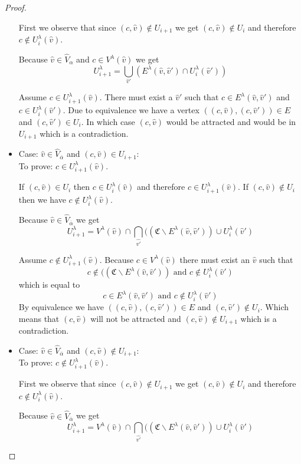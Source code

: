 \begin{lemma}
\begin{proof}
\begin{itemize}
			
			First we observe that since $(c, \hat{v}) \notin U_{i+1}$ we get $(c, \hat{v}) \notin U_{i}$ and therefore $c \notin U^\lambda_i(\hat{v})$.
			
			Because $\hat{v} \in \hat{V}_{\alpha}$ and $c \in V^\lambda(\hat{v})$ we get
			\[ U^\lambda_{i+1} =\bigcup_{\hat{v}'} (E^\lambda(\hat{v},\hat{v}') \cap U^\lambda_i(\hat{v}')) \]
			
			Assume $c \in U^\lambda_{i+1}(\hat{v})$. There must exist a $\hat{v}'$ such that $c \in E^\lambda(\hat{v},\hat{v}')$ and $c \in U^\lambda_i(\hat{v}')$. Due to equivalence we have a vertex $((c,\hat{v}),(c,\hat{v}')) \in E$ and $(c,\hat{v}') \in U_i$. In which case $(c,\hat{v})$ would be attracted and would be in $U_{i+1}$ which is a contradiction.
			\item Case: $\hat{v} \in \hat{V}_{\overline{\alpha}}$ and $(c,\hat{v}) \in U_{i+1}$:\\
			To prove: $c \in U^\lambda_{i+1}(\hat{v})$.
			
			If $(c,\hat{v}) \in U_i$ then $c \in U^\lambda_i(\hat{v})$ and therefore $c \in U^\lambda_{i+1}(\hat{v})$. If $(c,\hat{v}) \notin U_i$ then we have $c \notin U^\lambda_i(\hat{v})$.
			
			Because $\hat{v} \in \hat{V}_{\overline{\alpha}}$ we get
			\[ U^\lambda_{i+1} =V^\lambda(\hat{v}) \cap \bigcap_{\hat{v'}}((\mathfrak{C} \backslash E^\lambda(\hat{v},\hat{v}')) \cup U^\lambda_i(\hat{v}') \]
			
			Assume $c \notin U^\lambda_{i+1}(\hat{v})$. Because $c \in V^\lambda(\hat{v})$ there must exist an $\hat{v}$ such that
			\[ c \notin ((\mathfrak{C} \backslash E^\lambda(\hat{v},\hat{v}')) \text{ and } c \notin U^\lambda_i(\hat{v}') \]
			which is equal to
			\[ c \in E^\lambda(\hat{v},\hat{v}') \text{ and } c \notin U^\lambda_i(\hat{v}') \]
			By equivalence we have $((c,\hat{v}),(c,\hat{v}')) \in E$ and $(c,\hat{v}') \notin U_i$. Which means that $(c,\hat{v})$ will not be attracted and $(c,\hat{v}) \notin U_{i+1}$ which is a contradiction.
			\item Case: $\hat{v} \in \hat{V}_{\overline{\alpha}}$ and $(c,\hat{v}) \notin U_{i+1}$:\\
			To prove: $c \notin U^\lambda_{i+1}(\hat{v})$.
			
			First we observe that since $(c, \hat{v}) \notin U_{i+1}$ we get $(c, \hat{v}) \notin U_{i}$ and therefore $c \notin U^\lambda_i(\hat{v})$.
			
			Because $\hat{v} \in \hat{V}_{\overline{\alpha}}$ we get
			\[ U^\lambda_{i+1} =V^\lambda(\hat{v}) \cap \bigcap_{\hat{v'}}((\mathfrak{C} \backslash E^\lambda(\hat{v},\hat{v}')) \cup U^\lambda_i(\hat{v}') \]
			

\end{itemize}
\end{proof}
\end{lemma}
